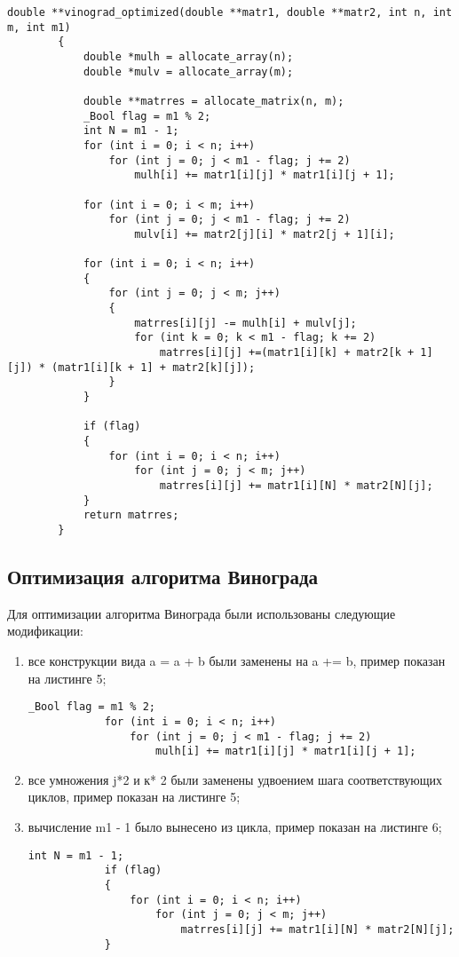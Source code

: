 \documentclass[a4paper, 14pt]{article}
\begin{document}
		\begin{lstlisting}[label=some-code,caption=Оптимизированный алгоритм Винограда]
		double **vinograd_optimized(double **matr1, double **matr2, int n, int m, int m1)
		{
			double *mulh = allocate_array(n);
			double *mulv = allocate_array(m);
	
			double **matrres = allocate_matrix(n, m);
			_Bool flag = m1 % 2;
			int N = m1 - 1;
			for (int i = 0; i < n; i++)
				for (int j = 0; j < m1 - flag; j += 2)
					mulh[i] += matr1[i][j] * matr1[i][j + 1];
            
			for (int i = 0; i < m; i++)
				for (int j = 0; j < m1 - flag; j += 2)
					mulv[i] += matr2[j][i] * matr2[j + 1][i];
            
			for (int i = 0; i < n; i++)
			{
				for (int j = 0; j < m; j++)
				{
					matrres[i][j] -= mulh[i] + mulv[j];
					for (int k = 0; k < m1 - flag; k += 2)
						matrres[i][j] +=(matr1[i][k] + matr2[k + 1][j]) * (matr1[i][k + 1] + matr2[k][j]);
				}
			}
    
			if (flag)    
			{
				for (int i = 0; i < n; i++)
					for (int j = 0; j < m; j++)
						matrres[i][j] += matr1[i][N] * matr2[N][j];
			}
			return matrres;
		}
		\end{lstlisting}
        \subsection{Оптимизация алгоритма Винограда}
        \parindent=1cm
        Для оптимизации алгоритма Винограда были использованы следующие модификации:
        \begin{enumerate}
        	\item все конструкции вида a = a + b были заменены на a += b, пример показан на листинге 5;
		\begin{lstlisting}[label=some-code,caption=Оптимизация 1 и 2]
			_Bool flag = m1 % 2;			
			for (int i = 0; i < n; i++)
				for (int j = 0; j < m1 - flag; j += 2)
					mulh[i] += matr1[i][j] * matr1[i][j + 1];
		\end{lstlisting}   
			\item все умножения j*2 и к* 2 были заменены удвоением шага соответствующих циклов, пример показан на листинге 5; 
			\item вычисление m1 - 1 было вынесено из цикла, пример показан на листинге 6;   
			\begin{lstlisting}[label=some-code,caption=Оптимизация 3]
			int N = m1 - 1;		    
			if (flag)    
			{
				for (int i = 0; i < n; i++)
					for (int j = 0; j < m; j++)
						matrres[i][j] += matr1[i][N] * matr2[N][j];
			}
		\end{lstlisting}   	
        \end{enumerate}
\end{document}
